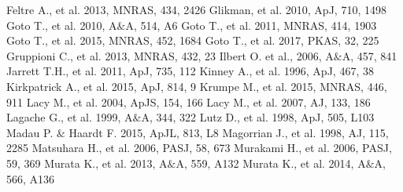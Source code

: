 \documentclass[a4paper,fleqn,usenatbib]{mnras}
\begin{document}
\begin{thebibliography}{99}
Feltre A., et al. 2013, MNRAS, 434, 2426
Glikman, et al. 2010, ApJ, 710, 1498
Goto T., et al. 2010, A$\&$A, 514, A6
Goto T., et al. 2011, MNRAS, 414, 1903
Goto T., et al. 2015, MNRAS, 452, 1684
Goto T., et al. 2017, PKAS, 32, 225
Gruppioni C., et al. 2013, MNRAS, 432, 23
Ilbert O. et al., 2006, A$\&$A, 457, 841
Jarrett T.H., et al. 2011, ApJ, 735, 112
Kinney A., et al. 1996, ApJ, 467, 38 
Kirkpatrick A., et al. 2015, ApJ, 814, 9 
Krumpe M., et al. 2015, MNRAS, 446, 911 
Lacy M., et al. 2004, ApJS, 154, 166
Lacy M., et al. 2007, AJ, 133, 186
Lagache G., et al. 1999, A$\&$A, 344, 322
Lutz D., et al. 1998, ApJ, 505, L103
Madau P. $\&$ Haardt F. 2015, ApJL, 813, L8
Magorrian J., et al. 1998, AJ, 115, 2285
Matsuhara H., et al. 2006, PASJ, 58, 673 
Murakami H., et al. 2006, PASJ, 59, 369 
Murata K., et al. 2013, A$\&$A, 559, A132
Murata K., et al. 2014, A$\&$A, 566, A136

\end{thebibliography}
\end{document}
